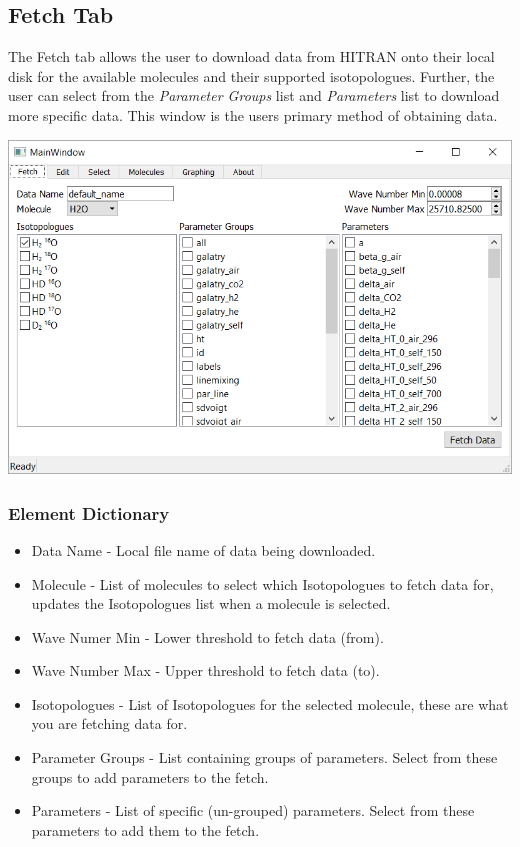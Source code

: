 \documentclass[12pt]{article}
\begin{document}
\subsection{Fetch Tab}
The Fetch tab allows the user to download data from HITRAN onto their local disk for the available molecules and their supported isotopologues. Further, the user can select from the \textit{Parameter Groups} list and \textit{Parameters} list to download more specific data. This window is the users primary method of obtaining data.
\begin{center}
\includegraphics[scale = 0.8]{MainWindow_Fetch}
\end{center}
\subsubsection{Element Dictionary}
\begin{itemize}
\item Data Name - Local file name of data being downloaded.
\item Molecule - List of molecules to select which Isotopologues to fetch data for, updates the Isotopologues list when a molecule is selected.
\item Wave Numer Min - Lower threshold to fetch data (from).
\item Wave Number Max - Upper threshold to fetch data (to).
\item Isotopologues - List of Isotopologues for the selected molecule, these are what you are fetching data for.
\item Parameter Groups - List containing groups of parameters. Select from these groups to add parameters to the fetch.
\item Parameters - List of specific (un-grouped) parameters. Select from these parameters to add them to the fetch.
\end{itemize}
\end{document}
